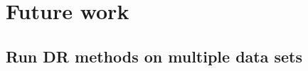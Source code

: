 \documentclass[journal, a4paper]{IEEEtran}
\begin{document}
%
%
%
%
%
%
%
%
%
%
%
%
%


\section{Future work}

\subsection{Run DR methods on multiple data sets}
\end{document}
